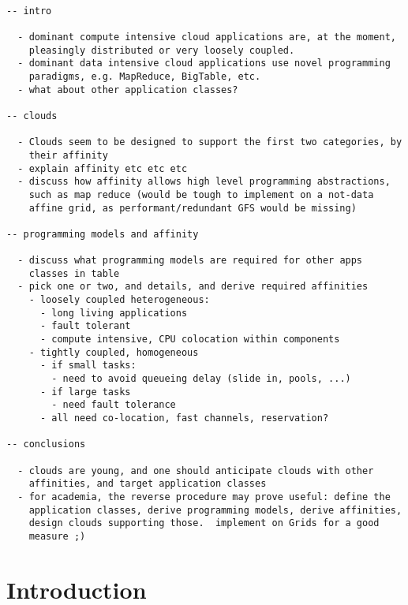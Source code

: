 \documentclass{article}
\begin{document}
\begin{verbatim}

-- intro

  - dominant compute intensive cloud applications are, at the moment,
    pleasingly distributed or very loosely coupled.  
  - dominant data intensive cloud applications use novel programming
    paradigms, e.g. MapReduce, BigTable, etc.
  - what about other application classes?

-- clouds

  - Clouds seem to be designed to support the first two categories, by
    their affinity
  - explain affinity etc etc etc
  - discuss how affinity allows high level programming abstractions,
    such as map reduce (would be tough to implement on a not-data
    affine grid, as performant/redundant GFS would be missing)

-- programming models and affinity

  - discuss what programming models are required for other apps
    classes in table
  - pick one or two, and details, and derive required affinities
    - loosely coupled heterogeneous:
      - long living applications
      - fault tolerant
      - compute intensive, CPU colocation within components
    - tightly coupled, homogeneous
      - if small tasks:
        - need to avoid queueing delay (slide in, pools, ...)
      - if large tasks
        - need fault tolerance
      - all need co-location, fast channels, reservation?

-- conclusions 

  - clouds are young, and one should anticipate clouds with other
    affinities, and target application classes
  - for academia, the reverse procedure may prove useful: define the
    application classes, derive programming models, derive affinities,
    design clouds supporting those.  implement on Grids for a good
    measure ;)

\end{verbatim}


\section{Introduction}
\end{document}
